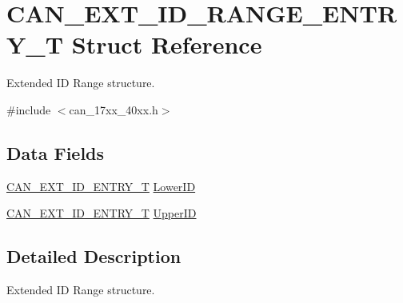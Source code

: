 \hypertarget{structCAN__EXT__ID__RANGE__ENTRY__T}{\section{C\-A\-N\-\_\-\-E\-X\-T\-\_\-\-I\-D\-\_\-\-R\-A\-N\-G\-E\-\_\-\-E\-N\-T\-R\-Y\-\_\-\-T Struct Reference}
\label{structCAN__EXT__ID__RANGE__ENTRY__T}
}


Extended I\-D Range structure.  




{\ttfamily \#include $<$can\-\_\-17xx\-\_\-40xx.\-h$>$}

\subsection*{Data Fields}
\begin{DoxyCompactItemize}
\item 
\hyperlink{structCAN__EXT__ID__ENTRY__T}{C\-A\-N\-\_\-\-E\-X\-T\-\_\-\-I\-D\-\_\-\-E\-N\-T\-R\-Y\-\_\-\-T} \hyperlink{structCAN__EXT__ID__RANGE__ENTRY__T_a704cb0823b253cecdb54c0cff24f5fac}{Lower\-I\-D}
\item 
\hyperlink{structCAN__EXT__ID__ENTRY__T}{C\-A\-N\-\_\-\-E\-X\-T\-\_\-\-I\-D\-\_\-\-E\-N\-T\-R\-Y\-\_\-\-T} \hyperlink{structCAN__EXT__ID__RANGE__ENTRY__T_a6889adbc72854cce6891e7595a96bf3d}{Upper\-I\-D}
\end{DoxyCompactItemize}


\subsection{Detailed Description}
Extended I\-D Range structure. 

